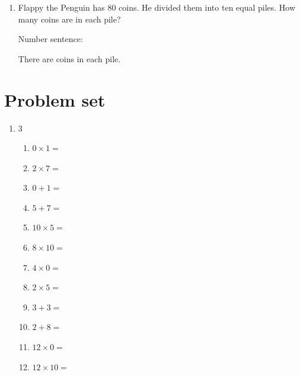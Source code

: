 \documentclass{tufte-book}
\begin{document}
\begin{enumerate}
\begin{enumerate}
\item Flappy the Penguin has 80 coins. He divided them into ten equal piles. How many coins are in each pile?\bigskip\par
Number sentence: \dotfill\bigskip\par
There are \dotfill coins in each pile.
\end{enumerate}

\end{enumerate}

\clearpage\section{Problem set }
\begin{enumerate}
\item
\begin{multicols}{3}
\begin{enumerate}
      \item $0 \times 1=$ \dotfill\bigskip
      \item $2 \times 7=$ \dotfill\bigskip
      \item $0 + 1=$ \dotfill\bigskip
      \item $5 + 7=$ \dotfill
      \item $10 \times 5=$ \dotfill\bigskip
      \item $8 \times 10=$ \dotfill\bigskip
      \item $4 \times 0=$ \dotfill\bigskip
      \item $2 \times 5=$ \dotfill
      \item $3 + 3=$ \dotfill\bigskip
      \item $2 + 8=$ \dotfill\bigskip
      \item $12 \times 0=$ \dotfill\bigskip
      \item $12 \times 10=$ \dotfill
\end{enumerate}
\end{multicols}


\end{enumerate}
\end{document}
